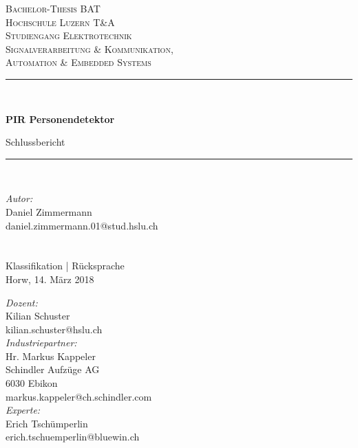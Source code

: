 \begin{titlepage}	
	\begin{center}	
		
		\textsc{\LARGE Bachelor-Thesis BAT }\\[1.0cm]
		
		\textsc{\Large Hochschule Luzern T\&A}\\[0.5cm]
		
		\textsc{Studiengang Elektrotechnik}\\[0.2cm]
		
		\textsc{	Signalverarbeitung \& Kommunikation, \\
			Automation \& Embedded Systems}\\[0.5cm]
		
		\newcommand{\HRule}{\rule{\linewidth}{0.5mm}}
		\HRule \\[0.4cm]
		{   \Huge \bfseries PIR Personendetektor\\
			\large \vspace{\baselineskip}
			
			\large Schlussbericht\\[0.2cm]
			
			\HRule \\[1cm]
			\large \vspace{\baselineskip}
		}
		\begingroup
		\parfillskip=0pt
		\large
		
		\begin{minipage}[t]{0.48\textwidth}
			\raggedright						
			\emph{Autor:}\\
			Daniel Zimmermann\\
			daniel.zimmermann.01@stud.hslu.ch\\
			\hfill \break
			\\[2.65cm]
			\hfill \break
			\\[0.5cm]
			{\large Klassifikation | Rücksprache\\ 
				Horw, 
				14. März 2018}
		\end{minipage}%
		\hfill
		\begin{minipage}[t]{0.48\textwidth}
			\raggedleft
			\emph{Dozent:} \\
			Kilian Schuster \\
			kilian.schuster@hslu.ch\\
			\hfill\break
			\emph{Industriepartner:} \\
			Hr. Markus Kappeler \\
			Schindler Aufzüge AG \\
			6030 Ebikon\\
			markus.kappeler@ch.schindler.com\\
			\hfill\break
			\emph{Experte:}\\
			Erich Tschümperlin\\
			erich.tschuemperlin@bluewin.ch\\
		\end{minipage}%
		\par\endgroup
		\hfill
		
	\end{center}	
\end{titlepage}
